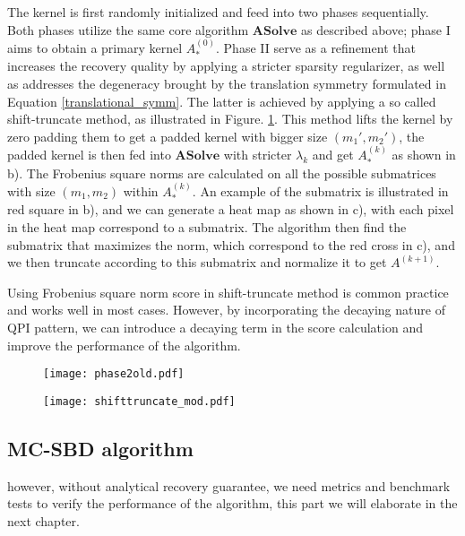 The kernel is first randomly initialized and feed into two phases sequentially. Both phases utilize the same core algorithm $\mathbf{ASolve}$ as described above; phase I aims to obtain a primary kernel $A^{(0)}_*$. Phase II serve as a refinement that increases the recovery quality by applying a stricter sparsity regularizer, as well as addresses the degeneracy brought by the translation symmetry formulated in Equation \ref{translational_symm}. The latter is achieved by applying a so called shift-truncate method, as illustrated in Figure. \ref{fig:ch6_phase2}. This method lifts the kernel by zero padding them to get a padded kernel with bigger size $(m_1',m_2')$, the padded kernel is then fed into $\mathbf{ASolve}$ with stricter $\lambda_{k}$ and get $A^{(k)}_*$ as shown in b). The Frobenius square norms are calculated on all the possible submatrices with size $(m_1,m_2)$ within $A^{(k)}_*$. An example of the submatrix is illustrated in red square in b), and we can generate a heat map as shown in c), with each pixel in the heat map correspond to a submatrix. The algorithm then find the submatrix that maximizes the norm, which correspond to the red cross in c), and we then truncate according to this submatrix and normalize it to get $A^{(k+1)}$. 

Using Frobenius square norm score in shift-truncate method is common practice and works well in most cases. However, by incorporating the decaying nature of QPI pattern, we can introduce a decaying term in the score calculation and improve the performance of the algorithm. 

\begin{figure}
	\texttt{[image: phase2old.pdf]}
	\centering
	\caption{}
	\label{fig:ch6_phase2}
\end{figure}


\begin{figure}
	\texttt{[image: shifttruncate\_mod.pdf]}
	\centering
	\caption{}
	\label{fig:ch6_phase2mod}
\end{figure}


\subsection{MC-SBD algorithm}
however, without analytical recovery guarantee, we need metrics and benchmark tests to verify the performance of the algorithm, this part we will elaborate in the next chapter. 
